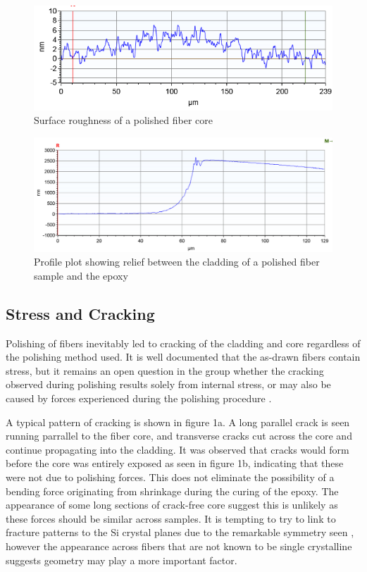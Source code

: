 \begin{figure}[h]
    \centering
    \includegraphics[width=\textwidth]{fig/Results/polished2.png}
    \caption{Surface roughness of a polished fiber core}
    \label{surface_roughness}
\end{figure}

\begin{figure}[h]
    \centering
    \includegraphics[width=\textwidth]{fig/Results/900expoydge2-1.jpg}    \caption{Profile plot showing relief between the cladding of a polished fiber sample and the epoxy}
    \label{profile}
\end{figure}

\subsection{Stress and Cracking}

Polishing of fibers inevitably led to cracking of the cladding and core regardless of the polishing method used. It is well documented that the as-drawn fibers contain stress, but it remains an open question in the group whether the cracking observed during polishing results solely from internal stress, or may also be caused by forces experienced during the polishing procedure \cite{Healy2018AFibres, Fokine2017LaserFibers, LapointeElectricalFibres, KristinKristin_thesis_final}. 

A typical pattern of cracking is shown in figure 1a. A long parallel crack is seen running parrallel to the fiber core, and transverse cracks cut across the core and continue propagating into the cladding. It was observed that cracks would form before the core was entirely exposed as seen in figure 1b, indicating that these were not due to polishing forces.  This does not eliminate the possibility of a bending force originating from shrinkage during the curing of the epoxy. The appearance of some long sections of crack-free core suggest this is unlikely as these forces should be similar across samples. It is tempting to try to link to fracture patterns to the Si crystal planes due to the remarkable symmetry seen \cite{KristinKristin_thesis_final}, however the appearance across fibers that are not known to be single crystalline suggests geometry may play a more important factor. 

